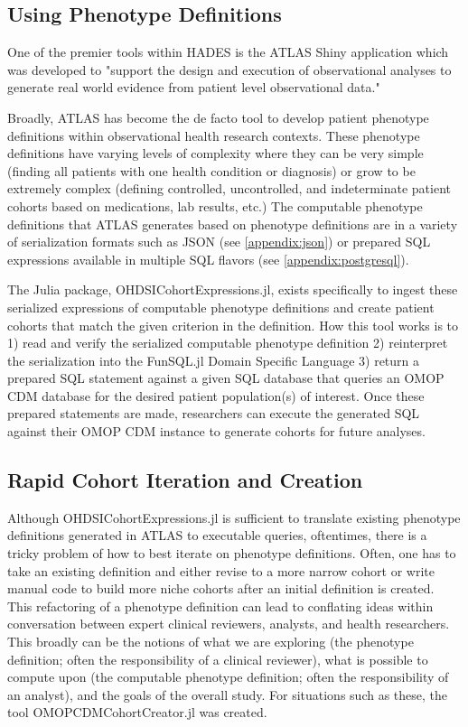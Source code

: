 \documentclass{juliacon}
\begin{document}
\subsection{Using Phenotype Definitions}

One of the premier tools within HADES is the ATLAS Shiny application which was developed to "support the design and execution of observational analyses to generate real world evidence from patient level observational data."

Broadly, ATLAS has become the de facto tool to develop patient phenotype definitions within observational health research contexts.
These phenotype definitions have varying levels of complexity where they can be very simple (finding all patients with one health condition or diagnosis) or grow to be extremely complex (defining controlled, uncontrolled, and indeterminate patient cohorts based on medications, lab results, etc.)
The computable phenotype definitions that ATLAS generates based on phenotype definitions are in a variety of serialization formats such as JSON (see \ref{appendix:json}) or prepared SQL expressions available in multiple SQL flavors (see \ref{appendix:postgresql}).

The Julia package, OHDSICohortExpressions.jl, exists specifically to ingest these serialized expressions of computable phenotype definitions and create patient cohorts that match the given criterion in the definition.
How this tool works is to 1) read and verify the serialized computable phenotype definition 2) reinterpret the serialization into the FunSQL.jl Domain Specific Language 3) return a prepared SQL statement against a given SQL database that queries an OMOP CDM database for the desired patient population(s) of interest.
Once these prepared statements are made, researchers can execute the generated SQL against their OMOP CDM instance to generate cohorts for future analyses.

\subsection{Rapid Cohort Iteration and Creation}

Although OHDSICohortExpressions.jl is sufficient to translate existing phenotype definitions generated in ATLAS to executable queries, oftentimes, there is a tricky problem of how to best iterate on phenotype definitions. \cite{zelkoDevelopingRobustComputable2023}
Often, one has to take an existing definition and either revise to a more narrow cohort or write manual code to build more niche cohorts after an initial definition is created.
This refactoring of a phenotype definition can lead to conflating ideas within conversation between expert clinical reviewers, analysts, and health researchers.
This broadly can be the notions of what we are exploring (the phenotype definition; often the responsibility of a clinical reviewer), what is possible to compute upon (the computable phenotype definition; often the responsibility of an analyst), and the goals of the overall study.
For situations such as these, the tool OMOPCDMCohortCreator.jl was created.
\end{document}
